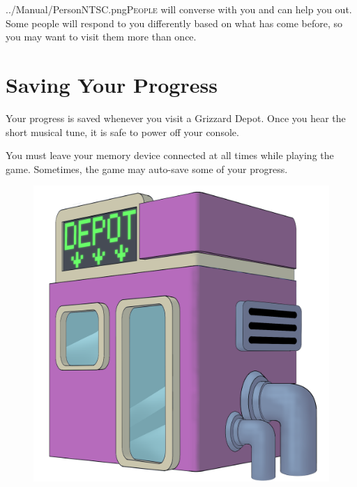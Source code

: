 \documentclass[10pt,twocolumn,openany,article]{memoir}
\begin{document}
\ifdefined\ATARIAGESAVE\else\vspace{30pt}\fi

\lettrine[image=true,                lines=5,               findent=3pt,
nindent=3pt]{../Manual/PersonNTSC.png}{People} will converse with you and
can help you  out. Some people will respond to  you differently based on
what has come before, so you may want to visit them more than once.


\ifdefined\NOSAVE\else

\section{Saving Your Progress}

Your progress  is saved whenever  you visit  a Grizzard Depot.  Once you
hear the short musical tune, it is safe to power off your console.

\ifdefined\ATARIAGESAVE\else

You must leave  your memory device connected at all  times while playing
the game. Sometimes, the game may auto-save some of your progress.

\fi \fi

\begin{figure}[t]
  \begin{center}
    \includegraphics[width=2\columnwidth]{../Manual/GrizzardDepot.png}
  \end{center}
\end{figure}
\end{document}
